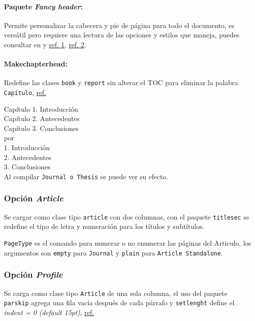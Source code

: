 \paragraph{Paquete \textit{Fancy header}:}
Permite personalizar la cabecera y pie de página para todo el documento, es versátil pero requiere una lectura de las opciones y estilos que maneja, puedes consultar en \cite{Oetiker2014} y \href{http://www.sharelatex.com/learn/Management_in_a_large_project}{ref. 1}, \href{http://en.wikibooks.org/wiki/LaTeX/Page_Layout#Customizing_with_fancyhdr}{ref. 2}.

\paragraph{Makechapterhead:}
Redefine las clases \verb|book| y \verb|report| sin alterar el TOC para eliminar la palabra \verb|Capítulo|, \href{http://tex.stackexchange.com/questions/62516/how-to-suppress-chapter-in-chapter-while-keeping-numbering/62527#62527}{ref.}

Capítulo 1. Introducción\\
Capítulo 2. Antecedentes\\
Capítulo 3. Conclusiones\\
por\\
1. Introducción\\
2. Antecedentes\\
3. Conclusiones\\

Al compilar \verb|Journal o Thesis| se puede ver su efecto.

\subsubsection{Opción \textit{Article}}
Se cargar como clase tipo \verb|article| con dos columnas, con el paquete \verb|titlesec| se redefine el tipo de letra y numeración para los títulos y subtítulos.

\verb|PageType| es el comando para numerar o no enumerar las páginas del Articulo, los argumentos son \verb|empty| para \verb|Journal| y \verb|plain| para \verb|Article Standalone|.



\subsubsection{Opción \textit{Profile}}
Se carga como clase tipo \verb|Article| de una sola columna, el uso del paquete \verb|parskip| agrega una fila vacía después de cada párrafo y \verb|setlenght| define el \textit{indent = 0 (default 15pt)}, \href{http://en.wikibooks.org/wiki/LaTeX/Paragraph_Formatting}{ref.}

